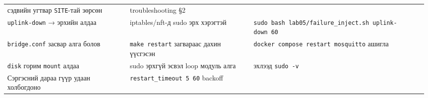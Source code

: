 \begin{longtable}[]{@{}lll@{}}
\begin{minipage}[t]{0.30\columnwidth}
сэдвийн угтвар \texttt{SITE}-тай зөрсөн\strut
\end{minipage} & \begin{minipage}[t]{0.30\columnwidth}\raggedright
troubleshooting §2\strut
\end{minipage}\tabularnewline
\begin{minipage}[t]{0.30\columnwidth}\raggedright
\texttt{uplink-down} → эрхийн алдаа\strut
\end{minipage} & \begin{minipage}[t]{0.30\columnwidth}\raggedright
iptables/nft-д sudo эрх хэрэгтэй\strut
\end{minipage} & \begin{minipage}[t]{0.30\columnwidth}\raggedright
\texttt{sudo\ bash\ lab05/\allowbreak{}failure\_\allowbreak{}inject.\allowbreak{}sh\ uplink-down\ 60}\strut
\end{minipage}\tabularnewline
\begin{minipage}[t]{0.30\columnwidth}\raggedright
\texttt{bridge.conf} засвар алга болов\strut
\end{minipage} & \begin{minipage}[t]{0.30\columnwidth}\raggedright
\texttt{make\ restart} загвараас дахин үүсгэсэн\strut
\end{minipage} & \begin{minipage}[t]{0.30\columnwidth}\raggedright
\texttt{docker\ compose\ restart\ mosquitto} ашигла\strut
\end{minipage}\tabularnewline
\begin{minipage}[t]{0.30\columnwidth}\raggedright
\texttt{disk} горим \texttt{mount} алдаа\strut
\end{minipage} & \begin{minipage}[t]{0.30\columnwidth}\raggedright
sudo эрхгүй эсвэл loop модуль алга\strut
\end{minipage} & \begin{minipage}[t]{0.30\columnwidth}\raggedright
эхлээд \texttt{sudo\ -v}\strut
\end{minipage}\tabularnewline
\begin{minipage}[t]{0.30\columnwidth}\raggedright
Сэргэсний дараа гүүр удаан холбогдоно\strut
\end{minipage} & \begin{minipage}[t]{0.30\columnwidth}\raggedright
\texttt{restart\_\allowbreak{}timeout\ 5\ 60} backoff\strut
\end{minipage} & \begin{minipage}[t]{0.30\columnwidth}\raggedright

\end{minipage}
\end{longtable}
